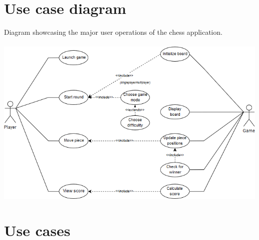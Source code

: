 \documentclass{article}
\begin{document}
    \section{Use case diagram}
    Diagram showcasing the major user operations of the chess application. \\ \\
    \includegraphics[scale=0.6]{usecase-diagram.png}

    \vspace{100mm}
    \section{Use cases}
\end{document}
